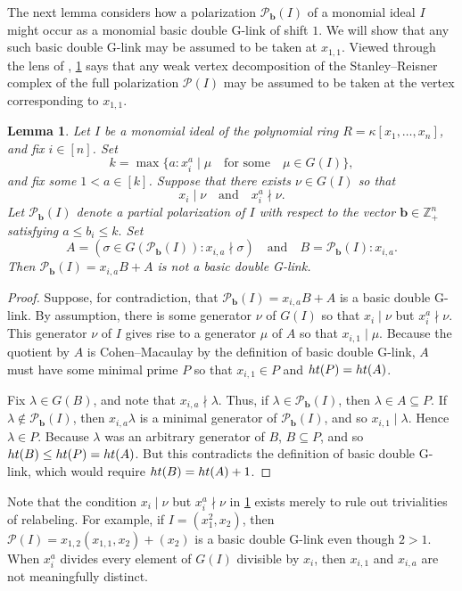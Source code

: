 \documentclass[12pt, reqno]{amsart}
\numberwithin{equation}{section}
\newtheorem{lemma}[theorem]{Lemma}
\newtheorem{Main Conjecture}[theorem]{Main Conjecture}
\theoremstyle{definition}
\theoremstyle{plain}
\newcommand{\hgt}{{\rm{ht }}}
\newcommand{\ZZ}{\mathbb{Z}}
\renewcommand{\P}{\mathcal{P}}
\newcommand{\bb}{\mathbf{b}}
\newcommand{\qand}{\quad \mbox{and} \quad}
\newcommand{\qforsome}{\quad \mbox{for some} \quad}
\begin{document}
The next lemma considers how a polarization $\P_{\bb}(I)$ of a monomial ideal $I$ might occur as a monomial basic double G-link of shift $1$. We will show that any such basic double G-link may be assumed to be taken at $x_{1,1}$. Viewed through the lens of \cite{NR08}, \cref{lem:noBadPols} says that any weak vertex decomposition of the Stanley--Reisner complex of the full polarization $\P(I)$ may be assumed to be taken at the vertex corresponding to $x_{1,1}$.

\begin{lemma}\label{lem:noBadPols}
Let $I$ be a monomial ideal of the polynomial ring $R = \kappa[x_1, \ldots, x_n]$, and fix $i \in [n]$. Set 
\[
k =  \max \{a: x_i^a \mid \mu \qforsome  \mu \in G(I)\}, 
\] and fix some $1<a \in [k]$.  Suppose that there exists $\nu \in G(I)$ so that $$x_i \mid \nu \qand x_i^a \nmid \nu.$$  
Let $\P_{\bb}(I)$ denote a partial polarization of $I$ with respect to the vector $\bb \in \ZZ_+^n$ satisfying $a \leq b_i \leq k.$  Set $$A = (\sigma \in G( \P_{\bb}(I)) : x_{i,a} \nmid \sigma) \qand B = \P_{\bb}(I):x_{i,a}.$$  Then $\P_{\bb}(I) = x_{i,a}B+A$ is not a basic double G-link.  
 \end{lemma}
 
 \begin{proof} Suppose, for contradiction, that $\P_{\bb}(I) = x_{i,a}B+A$ is a basic double G-link.  By assumption, there is some generator $\nu$ of $G(I)$ so that $x_i \mid \nu$ but $x_i^a \nmid \nu$.  This generator $\nu$ of $I$ gives rise to a generator $\mu$ of $A$ so that $x_{i,1} \mid \mu$.  Because the quotient by $A$ is Cohen--Macaulay by the definition of basic double G-link, $A$ must have some minimal prime $P$ so that $x_{i,1} \in P$ and $\hgt(P) = \hgt(A)$.  

Fix $\lambda \in G(B)$, and note that $x_{i,a} \nmid \lambda$.  Thus, if $\lambda \in \P_{\bb}(I)$, then $\lambda \in A \subseteq P$.  If $\lambda \notin \P_{\bb}(I)$, then $x_{i,a}\lambda$ is a minimal generator of $\P_{\bb}(I)$, and so $x_{i,1} \mid \lambda$.  Hence $\lambda \in P$.  Because $\lambda$ was an arbitrary generator of $B$, $B \subseteq P$, and so $\hgt(B) \leq \hgt(P) = \hgt(A)$.  But this contradicts the definition of basic double G-link, which would require $\hgt(B) = \hgt(A)+1$.
 \end{proof}

Note that the condition $x_i \mid \nu$ but $x_i^a \nmid \nu$ in \cref{lem:noBadPols} exists merely to rule out trivialities of relabeling.  For example, if $I = (x_1^2, x_2)$, then $\P(I) = x_{1,2}(x_{1,1}, x_{2})+(x_2)$ is a basic double G-link even though $2>1$.  When $x_i^a$ divides every element of $G(I)$ divisible by $x_i$, then $x_{i,1}$ and $x_{i,a}$ are not meaningfully distinct. 
\end{document}
